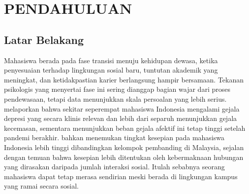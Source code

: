 
\chapter{PENDAHULUAN}
\label{ch:pendahuluan}


\section{Latar Belakang}
\label{sec:latar-belakang}

Mahasiswa berada pada fase transisi menuju kehidupan dewasa, ketika penyesuaian terhadap lingkungan sosial baru, tuntutan akademik yang meningkat, dan ketidakpastian karier berlangsung hampir bersamaan. Tekanan psikologis yang menyertai fase ini sering dianggap bagian wajar dari proses pendewasaan, tetapi data menunjukkan skala persoalan yang lebih serius. \textcite{astutik2020} melaporkan bahwa sekitar seperempat mahasiswa Indonesia mengalami gejala depresi yang secara klinis relevan dan lebih dari separuh menunjukkan gejala kecemasan, sementara \textcite{putri2024} menunjukkan beban gejala afektif ini tetap tinggi setelah pandemi berakhir. \textcite{ashilah2024} bahkan menemukan tingkat kesepian pada mahasiswa Indonesia lebih tinggi dibandingkan kelompok pembanding di Malaysia, sejalan dengan temuan \textcite{hawkleyCacioppo2010} bahwa kesepian lebih ditentukan oleh kebermaknaan hubungan yang dirasakan daripada jumlah interaksi sosial. Itulah sebabnya seorang mahasiswa dapat tetap merasa sendirian meski berada di lingkungan kampus yang ramai secara sosial.

